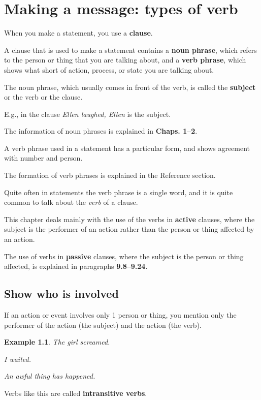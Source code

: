 \documentclass[oneside]{book}
\numberwithin{equation}{section}
\newtheorem{example}{Example}[section]
\begin{document}

\chapter{Making a message: types of verb}

\noindent{} When you make a statement, you use a \textbf{clause}.

A clause that is used to make a statement contains a \textbf{noun phrase}, which refers to the person or thing that you are talking about, and a \textbf{verb phrase}, which shows what short of action, process, or state you are talking about.

%
The noun phrase, which usually comes in front of the verb, is called the \textbf{subject} or the verb or the clause.

E.g., in the clause \textit{Ellen laughed, Ellen} is the subject.

The information of noun phrases is explained in \textbf{Chaps. 1--2}.

%
A verb phrase used in a statement has a particular form, and shows agreement with number and person.

The formation of verb phrases is explained in the Reference section.

Quite often in statements the verb phrase is a single word, and it is quite common to talk about the \textit{verb} of a clause.

%
This chapter deals mainly with the use of the verbs in \textbf{active} clauses, where the subject is the performer of an action rather than the person or thing affected by an action.

The use of verbs in \textbf{passive} clauses, where the subject is the person or thing affected, is explained in paragraphs \textbf{9.8--9.24}.

\section{Show who is involved}
\noindent{} If an action or event involves only 1 person or thing, you mention only the performer of the action (the subject) and the action (the verb).
\begin{example}
    The girl screamed.
    
    I waited.
    
    An awful thing has happened.
\end{example}
Verbs like this are called \textbf{intransitive verbs}.
\end{document}
